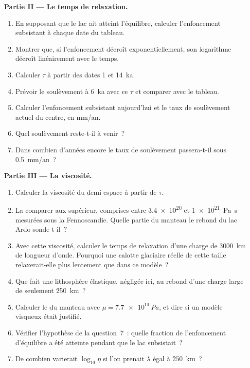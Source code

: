 \begin{problem}
\medskip\noindent\textbf{Partie II --- Le temps de relaxation.}
\begin{enumerate}[resume]
  \item En supposant que le lac ait atteint l'équilibre, calculer l'enfoncement subsistant
        à chaque date du tableau.
  \item Montrer que, si l'enfoncement décroît exponentiellement, son logarithme décroît
        linéairement avec le temps.
  \item Calculer $\tau$ à partir des dates 1 et \qty{14}{ka}.
  \item Prévoir le soulèvement à \qty{6}{ka} avec ce $\tau$ et comparer avec le
        tableau.
  \item Calculer l'enfoncement subsistant aujourd'hui et le taux de soulèvement actuel du
        centre, en \unit{mm/an}.
  \item Quel soulèvement reste-t-il à venir~?
  \item Dans combien d'années encore le taux de soulèvement passera-t-il sous
        \qty{0.5}{mm/an}~?
\end{enumerate}

\medskip\noindent\textbf{Partie III --- La viscosité.}
\begin{enumerate}[resume]
  \item Calculer la viscosité du demi-espace à partir de $\tau$.
  \item La comparer aux  supérieur, comprises entre \num{3.4e20} et
        \qty{1e21}{Pa.s} mesurées sous la Fennoscandie. Quelle partie du manteau
        le rebond du lac Ardo sonde-t-il~?
  \item Avec cette viscosité, calculer le temps de relaxation d'une charge
        de \qty{3000}{km} de longueur d'onde. Pourquoi une calotte glaciaire réelle de cette taille
        relaxerait-elle plus lentement que dans ce modèle~?
  \item Que fait une lithosphère élastique, négligée ici, au rebond
        d'une charge large de seulement \qty{250}{km}~?
  \item Calculer le  du manteau avec $\mu = \qty{7.7e10}{Pa}$,
        et dire si un modèle visqueux était justifié.
  \item Vérifier l'hypothèse de la question~7~: quelle fraction de l'enfoncement d'équilibre
        a été atteinte pendant que le lac subsistait~?
  \item De combien varierait $\log_{10}\eta$ si l'on prenait $\lambda$ égal à
        \qty{250}{km}~?
\end{enumerate}


\end{problem}
